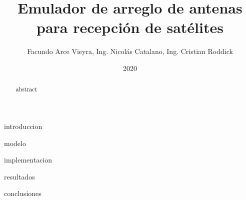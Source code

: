 \documentclass{article}
\title{Emulador de arreglo de antenas para recepción de satélites}
\date{2020}
\author{Facundo Arce Vieyra, Ing. Nicolás Catalano, Ing. Cristian Roddick}
\begin{document}
	\maketitle
	\newpage

	\begin{abstract}
		{abstract}
	\end{abstract}
	\newpage

	\listoftodos

	\newpage
	\thispagestyle{plain}
	\doublespacing
	\bigskip
	\tableofcontents

	\newpage
	\singlespacing

	{introduccion}
	\newpage

	{modelo}
	\newpage

	{implementacion}
	\newpage

	{resultados}
	\newpage

	{conclusiones}
	\newpage

	\printbibliography
	\newpage

	\begin{appendix}
		\listoffigures
	\end{appendix}
\end{document}
